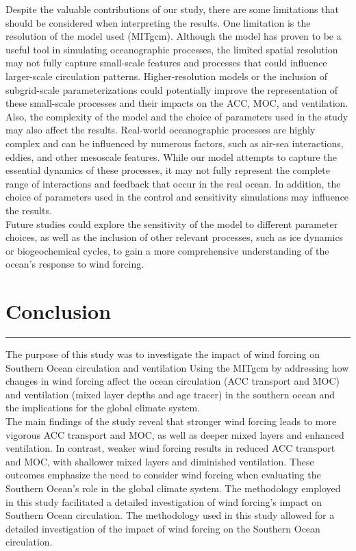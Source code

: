 \documentclass[12pt]{article}
\begin{document}
\noindent Despite the valuable contributions of our study, there are some limitations that should be considered when interpreting the results. One limitation is the resolution of the model used (MITgcm). Although the model has proven to be a useful tool in simulating oceanographic processes, the limited spatial resolution may not fully capture small-scale features and processes that could influence larger-scale circulation patterns. Higher-resolution models or the inclusion of subgrid-scale parameterizations could potentially improve the representation of these small-scale processes and their impacts on the ACC, MOC, and ventilation. Also, the complexity of the model and the choice of parameters used in the study may also affect the results. Real-world oceanographic processes are highly complex and can be influenced by numerous factors, such as air-sea interactions, eddies, and other mesoscale features. While our model attempts to capture the essential dynamics of these processes, it may not fully represent the complete range of interactions and feedback that occur in the real ocean. In addition, the choice of parameters used in the control and sensitivity simulations may influence the results. \\

\noindent Future studies could explore the sensitivity of the model to different parameter choices, as well as the inclusion of other relevant processes, such as ice dynamics or biogeochemical cycles, to gain a more comprehensive understanding of the ocean's response to wind forcing.












\newpage
\section{Conclusion}
\rule{\textwidth}{0.4pt}
The purpose of this study was to investigate the impact of wind forcing on Southern Ocean circulation and ventilation Using the MITgcm by addressing how changes in wind forcing affect the ocean circulation (ACC transport and MOC) and ventilation (mixed layer depths and age tracer) in the southern ocean and the implications for the global climate system.\\ 

\noindent The main findings of the study reveal that stronger wind forcing leads to more vigorous ACC transport and MOC, as well as deeper mixed layers and enhanced ventilation. In contrast, weaker wind forcing results in reduced ACC transport and MOC, with shallower mixed layers and diminished ventilation. These outcomes emphasize the need to consider wind forcing when evaluating the Southern Ocean's role in the global climate system. The methodology employed in this study facilitated a detailed investigation of wind forcing's impact on Southern Ocean circulation. The methodology used in this study allowed for a detailed investigation of the impact of wind forcing on the Southern Ocean circulation.\\
\end{document}
